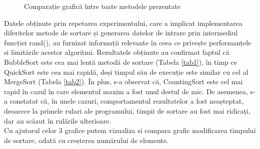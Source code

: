 \documentclass[12pt]{article}
\begin{document}
\begin{figure}
\caption{Comparație grafică între toate metodele prezentate}
\end{figure}
Datele obținute prin repetarea experimentului, care a implicat implementarea diferitelor metode de sortare și generarea datelor de intrare prin intermediul funcției rand(), au furnizat informații relevante în ceea ce privește performanțele si limitările acestor algoritmi. Rezultatele obținute au confirmat faptul că BubbleSort este cea mai lentă metodă de sortare (Tabela \ref{tab1}), în timp ce QuickSort este cea mai rapidă, deși timpul său de execuție este similar cu cel al MergeSort (Tabela \ref{tab2}). În plus, s-a observat că, CountingSort este cel mai rapid în cazul în care elementul maxim a fost unul destul de mic. De asemenea, s-a constatat că, în unele cazuri, comportamentul rezultatelor a fost neașteptat, deoarece la primele rulari ale programului, timpii de sortare au fost mai ridicați, dar au scăzut în rulările ulterioare. \\Cu ajutorul celor 3 grafice putem vizualiza si compara grafic modificarea timpului de sortare, odată cu creșterea numărului de elemente.
\end{document}
